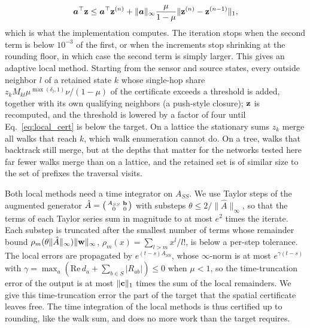 \documentclass[aps,pra,superscriptaddress,floatfix,longbibliography,twocolumn]{revtex4-2}
\newcommand{\bb}{{\bf b}}
\newcommand{\bc}{{\bf c}}
\newcommand{\bz}{{\bf z}}
\newcommand{\bw}{{\bf w}}
\begin{document}
\begin{equation}\label{eq:local_cert_n}
\bm{a}^\top\bz\le\bm{a}^\top\bz^{(n)}+\|\bm{a}\|_\infty\frac{\mu}{1-\mu}\|\bz^{(n)}-\bz^{(n-1)}\|_1 ,
\end{equation}
which is what the implementation computes. The iteration stops when the second term is below $10^{-3}$ of the first, or when the increments stop shrinking at the rounding floor, in which case the second term is simply larger. This gives an adaptive local method. Starting from the sensor and source states, every outside neighbor $l$ of a retained state $k$ whose single-hop share $z_kM_{kl}\mu^{\max(\delta_l,1)}\nu/(1-\mu)$ of the certificate exceeds a threshold is added, together with its own qualifying neighbors (a push-style closure); $\bz$ is recomputed, and the threshold is lowered by a factor of four until Eq.~\eqref{eq:local_cert} is below the target. On a lattice the stationary sums $z_k$ merge all walks that reach $k$, which walk enumeration cannot do. On a tree, walks that backtrack still merge, but at the depths that matter for the networks tested here far fewer walks merge than on a lattice, and the retained set is of similar size to the set of prefixes the traversal visits.

Both local methods need a time integrator on $A_{SS}$. We use Taylor steps of the augmented generator $\hat A=\left(\begin{smallmatrix}A_{SS}&\bb\\0&0\end{smallmatrix}\right)$ with substeps $\theta\le2/\|\hat A\|_\infty$, so that the terms of each Taylor series sum in magnitude to at most $e^2$ times the iterate. Each substep is truncated after the smallest number of terms whose remainder bound $\rho_m(\theta\|\hat A\|_\infty)\|\bw\|_\infty$, $\rho_m(x)=\sum_{l>m}x^l/l!$, is below a per-step tolerance. The local errors are propagated by $e^{(t-s)A_{SS}}$, whose $\infty$-norm is at most $e^{\gamma(t-s)}$ with $\gamma=\max_a(\mathrm{Re}\,d_a+\sum_{b\in S}|R_{ab}|)\le0$ when $\mu<1$, so the time-truncation error of the output is at most $\|\bc\|_1$ times the sum of the local remainders. We give this time-truncation error the part of the target that the spatial certificate leaves free. The time integration of the local methods is thus certified up to rounding, like the walk sum, and does no more work than the target requires.
\end{document}
